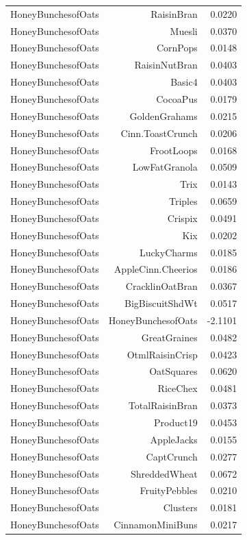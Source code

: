 \begin{longtable}{@{}lrr@{}}
HoneyBunchesofOats & RaisinBran & 0.0220 \\
HoneyBunchesofOats & Muesli & 0.0370 \\
HoneyBunchesofOats & CornPops & 0.0148 \\
HoneyBunchesofOats & RaisinNutBran & 0.0403 \\
HoneyBunchesofOats & Basic4 & 0.0403 \\
HoneyBunchesofOats & CocoaPus & 0.0179 \\
HoneyBunchesofOats & GoldenGrahams & 0.0215 \\
HoneyBunchesofOats & Cinn.ToastCrunch & 0.0206 \\
HoneyBunchesofOats & FrootLoops & 0.0168 \\
HoneyBunchesofOats & LowFatGranola & 0.0509 \\
HoneyBunchesofOats & Trix & 0.0143 \\
HoneyBunchesofOats & Triples & 0.0659 \\
HoneyBunchesofOats & Crispix & 0.0491 \\
HoneyBunchesofOats & Kix & 0.0202 \\
HoneyBunchesofOats & LuckyCharms & 0.0185 \\
HoneyBunchesofOats & AppleCinn.Cheerios & 0.0186 \\
HoneyBunchesofOats & CracklinOatBran & 0.0367 \\
HoneyBunchesofOats & BigBiscuitShdWt & 0.0517 \\
HoneyBunchesofOats & HoneyBunchesofOats & -2.1101 \\
HoneyBunchesofOats & GreatGraines & 0.0482 \\
HoneyBunchesofOats & OtmlRaisinCrisp & 0.0423 \\
HoneyBunchesofOats & OatSquares & 0.0620 \\
HoneyBunchesofOats & RiceChex & 0.0481 \\
HoneyBunchesofOats & TotalRaisinBran & 0.0373 \\
HoneyBunchesofOats & Product19 & 0.0453 \\
HoneyBunchesofOats & AppleJacks & 0.0155 \\
HoneyBunchesofOats & CaptCrunch & 0.0277 \\
HoneyBunchesofOats & ShreddedWheat & 0.0672 \\
HoneyBunchesofOats & FruityPebbles & 0.0210 \\
HoneyBunchesofOats & Clusters & 0.0181 \\
HoneyBunchesofOats & CinnamonMiniBuns & 0.0217 \\

\end{longtable}
